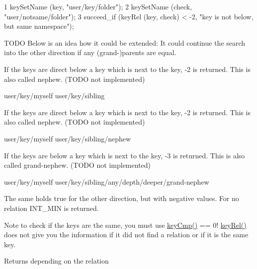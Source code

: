 \begin{DoxyCode}
1 keySetName (key, "user/key/folder");
2 keySetName (check, "user/notsame/folder");
3 succeed\_if (keyRel (key, check) < -2, "key is not below, but same namespace");
\end{DoxyCode}



\begin{DoxyCode}
\end{DoxyCode}


T\+O\+D\+O Below is an idea how it could be extended\+: It could continue the search into the other direction if any (grand-\/)parents are equal.


\begin{DoxyItemize}
\item If the keys are direct below a key which is next to the key, -\/2 is returned. This is also called nephew. (T\+O\+D\+O not implemented) \begin{DoxyVerb}user/key/myself
user/key/sibling
\end{DoxyVerb}

\item If the keys are direct below a key which is next to the key, -\/2 is returned. This is also called nephew. (T\+O\+D\+O not implemented) \begin{DoxyVerb}user/key/myself
user/key/sibling/nephew
\end{DoxyVerb}

\item If the keys are below a key which is next to the key, -\/3 is returned. This is also called grand-\/nephew. (T\+O\+D\+O not implemented) \begin{DoxyVerb}user/key/myself
user/key/sibling/any/depth/deeper/grand-nephew
\end{DoxyVerb}

\end{DoxyItemize}

The same holds true for the other direction, but with negative values. For no relation I\+N\+T\+\_\+\+M\+I\+N is returned.

\begin{DoxyNote}{Note}
to check if the keys are the same, you must use \hyperlink{group__keytest_gaf6e66e12fe04d535a5d1c8218ced803e}{key\+Cmp()} == 0! \hyperlink{group__keytest_ga6bb0f95ac34ce9c42d61bb35a76139d0}{key\+Rel()} does not give you the information if it did not find a relation or if it is the same key.
\end{DoxyNote}
\begin{DoxyReturn}{Returns}
depending on the relation 
\end{DoxyReturn}

